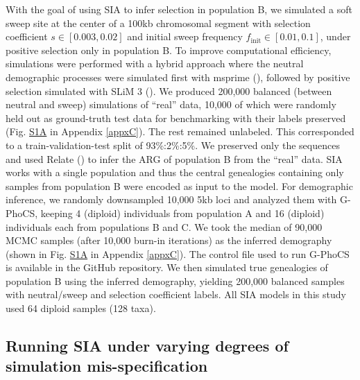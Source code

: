 With the goal of using \ac{SIA} to infer selection in population B, we simulated a soft sweep site at the center of a 100kb chromosomal segment with selection coefficient $s\in [0.003, 0.02]$ and initial sweep frequency $f_{\mathrm{init}} \in [0.01, 0.1]$, under positive selection only in population B. To improve computational efficiency, simulations were performed with a hybrid approach where the neutral demographic processes were simulated first with msprime (\cite{baumdicker_efficient_2022}), followed by positive selection simulated with SLiM 3 (\cite{haller_slim_2019,haller_tree-sequence_2019}). We produced 200,000 balanced (between neutral and sweep) simulations of “real” data, 10,000 of which were randomly held out as ground-truth test data for benchmarking with their labels preserved (Fig. \href{https://journals.plos.org/plosgenetics/article?id=10.1371/journal.pgen.1011032#sec018}{S1A} in Appendix \ref{appxC}). The rest remained unlabeled. This corresponded to a train-validation-test split of 93\%:2\%:5\%. We preserved only the sequences and used Relate (\cite{speidel_method_2019}) to infer the \ac{ARG} of population B from the “real” data. \ac{SIA} works with a single population and thus the central genealogies containing only samples from population B were encoded as input to the model. For demographic inference, we randomly downsampled 10,000 5kb loci and analyzed them with G-PhoCS, keeping 4 (diploid) individuals from population A and 16 (diploid) individuals each from populations B and C. We took the median of 90,000 \acs{MCMC} samples (after 10,000 burn-in iterations) as the inferred demography (shown in Fig. \href{https://journals.plos.org/plosgenetics/article?id=10.1371/journal.pgen.1011032#sec018}{S1A} in Appendix \ref{appxC}). The control file used to run G-PhoCS is available in the GitHub repository. We then simulated true genealogies of population B using the inferred demography, yielding 200,000 balanced samples with neutral/sweep and selection coefficient labels. All \ac{SIA} models in this study used 64 diploid samples (128 taxa).

\subsection{Running \ac{SIA} under varying degrees of simulation mis-specification}

